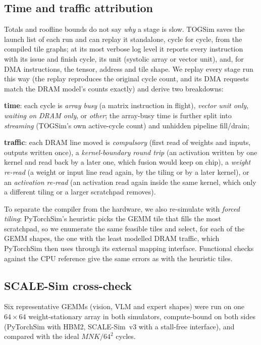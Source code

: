 \subsection{Time and traffic attribution}
\label{subsec:method-attribution}

Totals and roofline bounds do not say \emph{why} a stage is slow. TOGSim saves the launch list of each run and can replay it standalone, cycle for cycle, from the compiled tile graphs; at its most verbose log level it reports every instruction with its issue and finish cycle, its unit (systolic array or vector unit), and, for DMA instructions, the tensor, address and tile shape. We replay every stage run this way (the replay reproduces the original cycle count, and its DMA requests match the DRAM model's counts exactly) and derive two breakdowns:
\begin{dashlist}
  \item \textbf{time}: each cycle is \emph{array busy} (a matrix instruction in flight), \emph{vector unit only}, \emph{waiting on DRAM only}, or \emph{other}; the array-busy time is further split into \emph{streaming} (TOGSim's own active-cycle count) and unhidden pipeline fill/drain;
  \item \textbf{traffic}: each DRAM line moved is \emph{compulsory} (first read of weights and inputs, outputs written once), a \emph{kernel-boundary round trip} (an activation written by one kernel and read back by a later one, which fusion would keep on chip), a \emph{weight re-read} (a weight or input line read again, by the tiling or by a later kernel), or an \emph{activation re-read} (an activation read again inside the same kernel, which only a different tiling or a larger scratchpad removes).
\end{dashlist}

To separate the compiler from the hardware, we also re-simulate with \emph{forced tiling}: PyTorchSim's heuristic picks the GEMM tile that fills the most scratchpad, so we enumerate the same feasible tiles and select, for each of the GEMM shapes, the one with the least modelled DRAM traffic, which PyTorchSim then uses through its external mapping interface. Functional checks against the CPU reference give the same errors as with the heuristic tiles.

\subsection{SCALE-Sim cross-check}
\label{subsec:method-scalesim}

Six representative GEMMs (vision, VLM and expert shapes) were run on one $64\times64$ weight-stationary array in both simulators, compute-bound on both sides (PyTorchSim with HBM2, SCALE-Sim~v3 with a stall-free interface), and compared with the ideal $MNK/64^2$ cycles.
